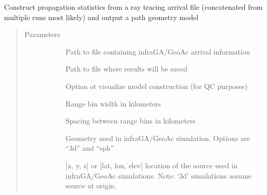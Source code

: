\documentclass[letterpaper,10pt,english]{sphinxmanual}
\begin{document}
\begin{fulllineitems}
\begin{fulllineitems}
\label{\detokenize{stochprop.propagation:stochprop.propagation.PathGeometryModel.build}}
Construct propagation statistics from a ray tracing arrival file (concatenated from
multiple runs most likely) and output a path geometry model
\begin{quote}\begin{description}
\item[{Parameters}] \leavevmode\begin{description}
\item[{}] \leavevmode
Path to file containing infraGA/GeoAc arrival information

\item[{}] \leavevmode
Path to file where results will be saved

\item[{}] \leavevmode
Option ot visualize model construction (for QC purposes)

\item[{}] \leavevmode
Range bin width in kilometers

\item[{}] \leavevmode
Spacing between range bins in kilometers

\item[{}] \leavevmode
Geometry used in infraGA/GeoAc simulation.  Options are “3d” and “sph”

\item[{}] \leavevmode
{[}x, y, z{]} or {[}lat, lon, elev{]} location of the source used in infraGA/GeoAc simulations.  Note: ‘3d’ simulations assume source at origin.


\end{description}
\end{description}
\end{quote}
\end{fulllineitems}
\end{fulllineitems}
\end{document}

